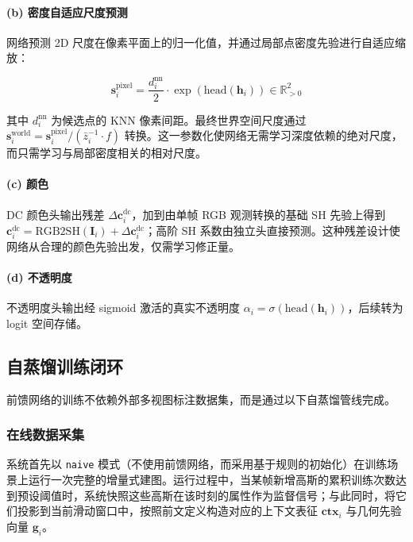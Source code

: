 \paragraph{(b) 密度自适应尺度预测}

网络预测 2D 尺度在像素平面上的归一化值，并通过局部点密度先验进行自适应缩放：

\begin{equation}
\mathbf{s}_i^{\text{pixel}} = \frac{d_i^{\text{nn}}}{2} \cdot \exp(\text{head}(\mathbf{h}_i)) \in \mathbb{R}^2_{>0}
\end{equation}

其中 $d_i^{\text{nn}}$ 为候选点的 KNN 像素间距。最终世界空间尺度通过 $\mathbf{s}_i^{\text{world}} = \mathbf{s}_i^{\text{pixel}} / (\bar{z}_i^{-1} \cdot f)$ 转换。这一参数化使网络无需学习深度依赖的绝对尺度，而只需学习与局部密度相关的相对尺度。

\paragraph{(c) 颜色}

DC 颜色头输出残差 $\Delta \mathbf{c}_i^{\text{dc}}$，加到由单帧 RGB 观测转换的基础 SH 先验上得到 $\mathbf{c}_i^{\text{dc}} = \text{RGB2SH}(\mathbf{I}_i) + \Delta \mathbf{c}_i^{\text{dc}}$；高阶 SH 系数由独立头直接预测。这种残差设计使网络从合理的颜色先验出发，仅需学习修正量。

\paragraph{(d) 不透明度}

不透明度头输出经 sigmoid 激活的真实不透明度 $\alpha_i = \sigma(\text{head}(\mathbf{h}_i))$，后续转为 logit 空间存储。

\subsection{自蒸馏训练闭环}

前馈网络的训练不依赖外部多视图标注数据集，而是通过以下自蒸馏管线完成。

\subsubsection{在线数据采集}

系统首先以 \texttt{naive} 模式（不使用前馈网络，而采用基于规则的初始化）在训练场景上运行一次完整的增量式建图。运行过程中，当某帧新增高斯的累积训练次数达到预设阈值时，系统快照这些高斯在该时刻的属性作为监督信号；与此同时，将它们投影到当前滑动窗口中，按照前文定义构造对应的上下文表征 $\mathbf{ctx}_i$ 与几何先验向量 $\mathbf{g}_i$。

